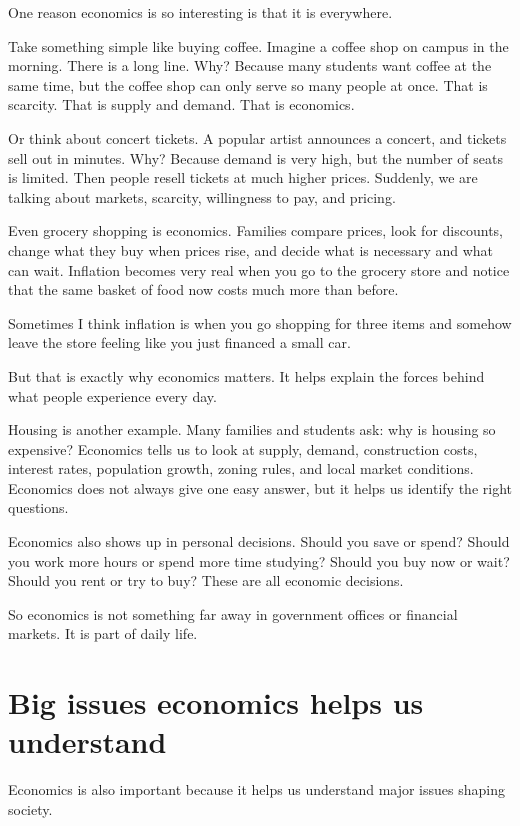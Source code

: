 \documentclass[12pt]{article}
\begin{document}
One reason economics is so interesting is that it is everywhere.

Take something simple like buying coffee. Imagine a coffee shop on campus in the morning. There is a long line. Why? Because many students want coffee at the same time, but the coffee shop can only serve so many people at once. That is scarcity. That is supply and demand. That is economics.

Or think about concert tickets. A popular artist announces a concert, and tickets sell out in minutes. Why? Because demand is very high, but the number of seats is limited. Then people resell tickets at much higher prices. Suddenly, we are talking about markets, scarcity, willingness to pay, and pricing.

Even grocery shopping is economics. Families compare prices, look for discounts, change what they buy when prices rise, and decide what is necessary and what can wait. Inflation becomes very real when you go to the grocery store and notice that the same basket of food now costs much more than before.

Sometimes I think inflation is when you go shopping for three items and somehow leave the store feeling like you just financed a small car.

But that is exactly why economics matters. It helps explain the forces behind what people experience every day.

Housing is another example. Many families and students ask: why is housing so expensive? Economics tells us to look at supply, demand, construction costs, interest rates, population growth, zoning rules, and local market conditions. Economics does not always give one easy answer, but it helps us identify the right questions.

Economics also shows up in personal decisions. Should you save or spend? Should you work more hours or spend more time studying? Should you buy now or wait? Should you rent or try to buy? These are all economic decisions.

So economics is not something far away in government offices or financial markets. It is part of daily life.

\section*{Big issues economics helps us understand}

Economics is also important because it helps us understand major issues shaping society.
\end{document}
